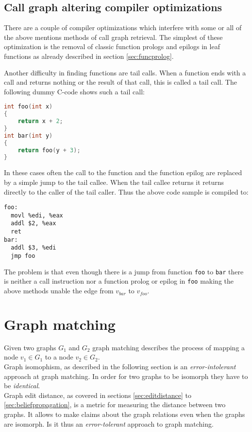 \documentclass[
    12pt,                               %
    DIV=14,                     %
    parskip=half+,              %
    bigheadings,                %
    cleardoubleempty,   %
    halfparskip,                %
    ]{scrreprt} %
\begin{document}
\section{Call graph altering compiler optimizations} \label{sec:optimizationproblems}
There are a couple of compiler optimizations which interfere with some or all of the above mentions methods of call graph retrieval. The simplest of these optimization is the removal of classic function prologs and epilogs in leaf functions as already described in section \ref{sec:funcprolog}.

Another difficulty in finding functions are tail calls. When a function ends with a call and returns nothing or the result of that call, this is called a tail call. The following dummy C-code shows such a tail call:
\begin{lstlisting}[language=C]
int foo(int x)
{
	return x + 2;
}
int bar(int y)
{
	return foo(y + 3);
}
\end{lstlisting}

In these cases often the call to the function and the function epilog are replaced by a simple jump to the tail callee. When the tail callee returns it returns directly to the caller of the tail caller. Thus the above code sample is compiled to:
\begin{lstlisting}
foo:
  movl %edi, %eax
  addl $2, %eax
  ret
bar:
  addl $3, %edi
  jmp foo
\end{lstlisting}

The problem is that even though there is a jump from function \verb'foo' to \verb'bar' there is neither a call instruction nor a function prolog or epilog in \verb'foo' making the above methods unable the edge from $v_{bar}$ to $v_{foo}$.


\chapter{Graph matching} \label{chap:graphmatching}
Given two graphs $G_1$ and $G_2$ graph matching describes the process of mapping a node $v_1 \in G_1$ to a node $v_2 \in G_2$. \\
Graph isomophism, as described in the following section is an \textit{error-intolerant} approach at graph matching. In order for two graphs to be isomorph they have to be \textit{identical}. \\
Graph edit distance, as covered in sections \ref{sec:editdistance} to \ref{sec:beliefpropagation}, is a metric for measuring the distance between two graphs. It allows to make claims about the graph relations even when the graphs are isomorph. Is it thus an \textit{error-tolerant} approach to graph matching.
\end{document}
